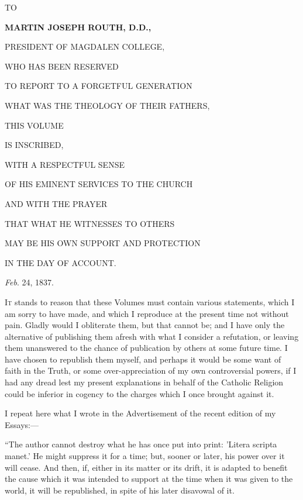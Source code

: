 



TO


\textbf{MARTIN JOSEPH ROUTH, D.D.,}



PRESIDENT OF MAGDALEN COLLEGE,



WHO HAS BEEN RESERVED


TO REPORT TO A FORGETFUL GENERATION


WHAT WAS THE THEOLOGY OF THEIR
FATHERS,


THIS VOLUME



IS INSCRIBED,


WITH A RESPECTFUL SENSE


OF HIS EMINENT SERVICES TO THE CHURCH


AND WITH THE PRAYER


THAT WHAT HE WITNESSES TO OTHERS


MAY BE HIS OWN SUPPORT AND PROTECTION


IN THE DAY OF ACCOUNT.


\emph{Feb}. 24, 1837.









I\textsc{t} stands to reason that these Volumes must contain various
statements, which I am sorry to have made, and which I reproduce at
the present time not without pain. Gladly would I obliterate them, but
that cannot be; and I have only the alternative of publishing them
afresh with what I consider a refutation, or leaving them unanswered
to the chance of publication by others at some future time. I have
chosen to republish them myself, and perhaps it would be some want of
faith in the Truth, or some over-appreciation of my own controversial
powers, if I had any dread lest my present explanations in behalf of
the Catholic Religion could be inferior in cogency to the charges
which I once brought against it.


I repeat here what I wrote in the Advertisement of the recent
edition of my Essays:—


``The author cannot destroy what he has
once put into print: 'Litera scripta manet.' He might suppress it for
a time; but, sooner or later, his power over it will cease. And
then, if, either in its matter or its drift, it is adapted to benefit
the cause which it was intended to support at the time when it was
given to the world, it will be republished, in spite of his later
disavowal of it.


